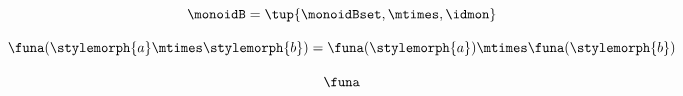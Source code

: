 {\begin{forslides}
        \begin{equation}
            \label{eq:slides-translation-17}
            \monoidB = \tup{{\monoidBset}, \mtimes, \idmon}
        \end{equation}

        \begin{equation}
            \label{eq:slides-translation-18}
            \funa ( \stylemorph{a} \mtimes \stylemorph{b} ) =  \funa(\stylemorph{a}) \mtimes \funa(\stylemorph{b})
        \end{equation}

        \begin{equation}
            \label{eq:slides-translation-19}
            \funa
        \end{equation}








\end{forslides}}

